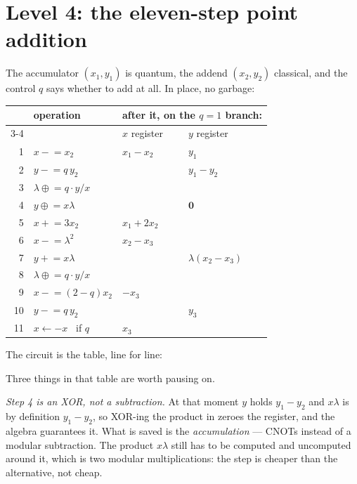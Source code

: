 \section{Level 4: the eleven-step point addition}\label{ec:sec:padd}

The accumulator $(x_1,y_1)$ is quantum, the addend $(x_2,y_2)$ classical, and the control $q$ says
whether to add at all. In place, no garbage:

\begin{center}\small\setlength{\tabcolsep}{6pt}
\begin{tabular}{@{}rlll@{}}
\toprule
& operation & \multicolumn{2}{l}{after it, on the $q=1$ branch:}\\
\cmidrule(l){3-4}
& & $x$ register & $y$ register\\
\midrule
1 & $x \mathrel{-}= x_2$                      & $x_1-x_2$ & $y_1$\\
2 & $y \mathrel{-}= q\,y_2$                   & & $y_1-y_2$\\
3 & $\lambda \mathrel{\oplus}= q\cdot y/x$    & & \\
4 & $y \mathrel{\oplus}= x\lambda$            & & $\mathbf{0}$\\
5 & $x \mathrel{+}= 3x_2$                     & $x_1+2x_2$ & \\
6 & $x \mathrel{-}= \lambda^2$                & $x_2-x_3$ & \\
7 & $y \mathrel{+}= x\lambda$                 & & $\lambda(x_2-x_3)$\\
8 & $\lambda \mathrel{\oplus}= q\cdot y/x$    & & \\
9 & $x \mathrel{-}= (2-q)x_2$                 & $-x_3$ & \\
10 & $y \mathrel{-}= q\,y_2$                  & & $y_3$\\
11 & $x \leftarrow -x$ \ if $q$               & $x_3$ & \\
\bottomrule
\end{tabular}
\end{center}

\noindent
The circuit is the table, line for line:


\noindent
Three things in that table are worth pausing on.

\emph{Step 4 is an XOR, not a subtraction.} At that moment $y$ holds $y_1-y_2$ and $x\lambda$ is by
definition $y_1-y_2$, so XOR-ing the product in zeroes the register, and the algebra guarantees it.
What is saved is the \emph{accumulation} --- CNOTs instead of a modular subtraction. The product
$x\lambda$ still has to be computed and uncomputed around it, which is two modular multiplications:
the step is cheaper than the alternative, not cheap.

